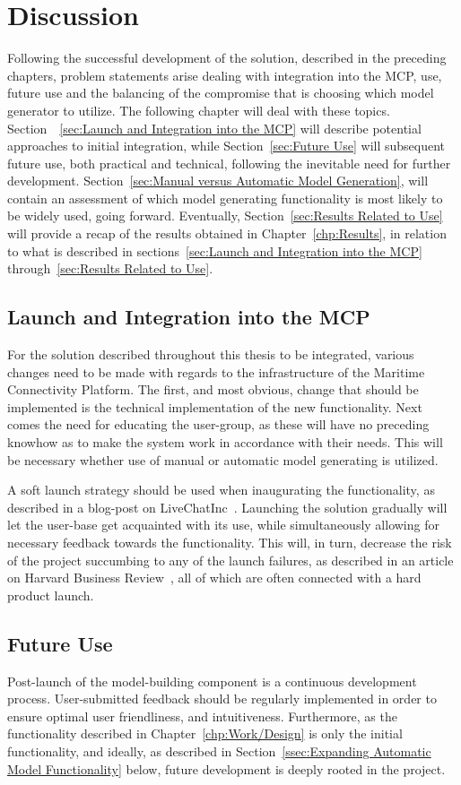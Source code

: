 \chapter{Discussion}
Following the successful development of the solution, described in the preceding chapters, problem statements arise dealing with integration into the MCP, use, future use and the balancing of the compromise that is choosing which model generator to utilize. The following chapter will deal with these topics. Section ~\ref{sec:Launch and Integration into the MCP} will describe potential approaches to initial integration, while Section~\ref{sec:Future Use} will subsequent future use, both practical and technical, following the inevitable need for further development. Section~\ref{sec:Manual versus Automatic Model Generation}, will contain an assessment of which model generating functionality is most likely to be widely used, going forward. Eventually, Section~\ref{sec:Results Related to Use} will provide a recap of the results obtained in Chapter~\ref{chp:Results}, in relation to what is described in sections~\ref{sec:Launch and Integration into the MCP} through~\ref{sec:Results Related to Use}.

\section{Launch and Integration into the MCP}
For the solution described throughout this thesis to be integrated, various changes need to be made with regards to the infrastructure of the Maritime Connectivity Platform. The first, and most obvious, change that should be implemented is the technical implementation of the new functionality. Next comes the need for educating the user-group, as these will have no preceding knowhow as to make the system work in accordance with their needs. This will be necessary whether use of manual or automatic model generating is utilized.

A soft launch strategy should be used when inaugurating the functionality, as described in a blog-post on LiveChatInc~\cite{hardoSoft}. Launching the solution gradually will let the user-base get acquainted with its use, while simultaneously allowing for necessary feedback towards the functionality. This will, in turn, decrease the risk of the project succumbing to any of the launch failures, as described in an article on Harvard Business Review~\cite{hbr}, all of which are often connected with a hard product launch.
\section{Future Use}
Post-launch of the model-building component is a continuous development process. User-submitted feedback should be regularly implemented in order to ensure optimal user friendliness, and intuitiveness. Furthermore, as the functionality described in Chapter~\ref{chp:Work/Design} is only the initial functionality, and ideally, as described in Section~\ref{ssec:Expanding Automatic Model Functionality} below, future development is deeply rooted in the project.

